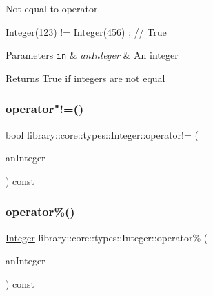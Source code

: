 Not equal to operator. 


\begin{DoxyCode}
\hyperlink{classlibrary_1_1core_1_1types_1_1_integer_a6483b1c4e13e5ed6af5e7a58347efead}{Integer}(123) != \hyperlink{classlibrary_1_1core_1_1types_1_1_integer_a6483b1c4e13e5ed6af5e7a58347efead}{Integer}(456) ; \textcolor{comment}{// True}
\end{DoxyCode}



\begin{DoxyParams}[1]{Parameters}
\mbox{\tt in}  & {\em an\+Integer} & An integer \\
\hline
\end{DoxyParams}
\begin{DoxyReturn}{Returns}
True if integers are not equal 
\end{DoxyReturn}
\mbox{\label{classlibrary_1_1core_1_1types_1_1_integer_a9c3c4e9564a3a8da5133207f3197d3a3}} 
\subsubsection{\texorpdfstring{operator"!=()}{operator!=()}\hspace{0.1cm}{\footnotesize\ttfamily [2/2]}}
{\footnotesize\ttfamily bool library\+::core\+::types\+::\+Integer\+::operator!= (\begin{DoxyParamCaption}\item[{const \hyperlink{classlibrary_1_1core_1_1types_1_1_integer_a623afb1580f870fd8a1997b1c12c917d}{Integer\+::\+Value\+Type} \&}]{an\+Integer }\end{DoxyParamCaption}) const}

\mbox{\label{classlibrary_1_1core_1_1types_1_1_integer_aaef6b38feb77d2d901cb75546690ff19}} 
\subsubsection{\texorpdfstring{operator\%()}{operator\%()}\hspace{0.1cm}{\footnotesize\ttfamily [1/2]}}
{\footnotesize\ttfamily \hyperlink{classlibrary_1_1core_1_1types_1_1_integer}{Integer} library\+::core\+::types\+::\+Integer\+::operator\% (\begin{DoxyParamCaption}\item[{const \hyperlink{classlibrary_1_1core_1_1types_1_1_integer}{Integer} \&}]{an\+Integer }\end{DoxyParamCaption}) const}

